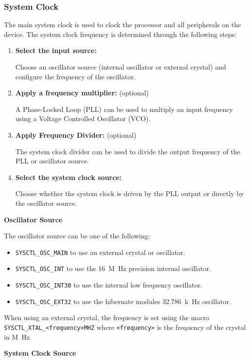 \documentclass{article}
\begin{document}
\subsubsection{System Clock}
The main system clock is used to clock the processor and all
peripherals on the device. The system clock frequency is determined
through the following steps:
\begin{enumerate}
    \item \textbf{Select the input source:}

          Choose an oscillator source (internal oscillator or external
          crystal) and configure the frequency of the oscillator.
    \item \textbf{Apply a frequency multiplier:} (optional)

          A Phase-Locked Loop (PLL) can be used to multiply an input
          frequency using a Voltage Controlled Oscillator (VCO).
    \item \textbf{Apply Frequency Divider:} (optional)

          The system clock divider can be used to divide the output
          frequency of the PLL or oscillator source.
    \item \textbf{Select the system clock source:}

          Choose whether the system clock is driven by the PLL output
          or directly by the oscillator source.
\end{enumerate}

\medskip
\textbf{Oscillator Source}

The oscillator source can be one of the following:
\begin{itemize}
    \item \texttt{SYSCTL_OSC_MAIN} to use an external crystal or oscillator.
    \item \texttt{SYSCTL_OSC_INT} to use the \qty{16}{M.Hz} precision internal oscillator.
    \item \texttt{SYSCTL_OSC_INT30} to use the internal low frequency oscillator.
    \item \texttt{SYSCTL_OSC_EXT32} to use the hibernate modules \qty{32.786}{k.Hz} oscillator.
\end{itemize}
When using an external crystal, the frequency is set using the
macro \texttt{SYSCTL_XTAL_<frequency>MHZ} where
\texttt{<frequency>} is the frequency of the crystal in \unit{M.Hz}.

\medskip
\textbf{System Clock Source}
\end{document}
